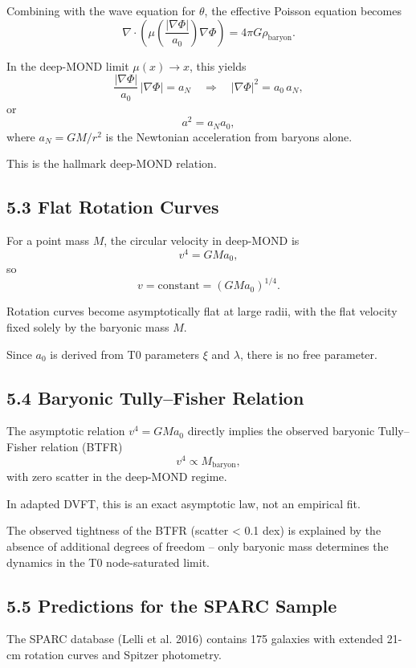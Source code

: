 	Combining with the wave equation for $\theta$, the effective Poisson equation becomes
	\[
	\nabla \cdot \left( \mu\left(\frac{|\nabla \Phi|}{a_0}\right) \nabla \Phi \right) = 4\pi G \rho_{\text{baryon}}.
	\]
	
	In the deep-MOND limit $\mu(x) \to x$, this yields
	\[
	\frac{|\nabla \Phi|}{a_0}\,|\nabla \Phi| = a_N \quad\Rightarrow\quad |\nabla \Phi|^2 = a_0\, a_N,
	\]
	or
	\[
	a^2 = a_N a_0,
	\]
	where $a_N = GM/r^2$ is the Newtonian acceleration from baryons alone.
	
	This is the hallmark deep-MOND relation.
	
	\subsection{5.3 Flat Rotation Curves}
	
	For a point mass $M$, the circular velocity in deep-MOND is
	\[
	v^4 = G M a_0,
	\]
	so
	\[
	v = \text{constant} = (G M a_0)^{1/4}.
	\]
	
	Rotation curves become asymptotically flat at large radii, with the flat velocity fixed solely by the baryonic mass $M$.
	
	Since $a_0$ is derived from T0 parameters $\xi$ and $\lambda$, there is no free parameter.
	
	\subsection{5.4 Baryonic Tully–Fisher Relation}
	
	The asymptotic relation $v^4 = G M a_0$ directly implies the observed baryonic Tully–Fisher relation (BTFR)
	\[
	v^4 \propto M_{\text{baryon}},
	\]
	with zero scatter in the deep-MOND regime.
	
	In adapted DVFT, this is an exact asymptotic law, not an empirical fit.
	
	The observed tightness of the BTFR (scatter < 0.1 dex) is explained by the absence of additional degrees of freedom – only baryonic mass determines the dynamics in the T0 node-saturated limit.
	
	\subsection{5.5 Predictions for the SPARC Sample}
	
	The SPARC database (Lelli et al. 2016) contains 175 galaxies with extended 21-cm rotation curves and Spitzer photometry.
	
